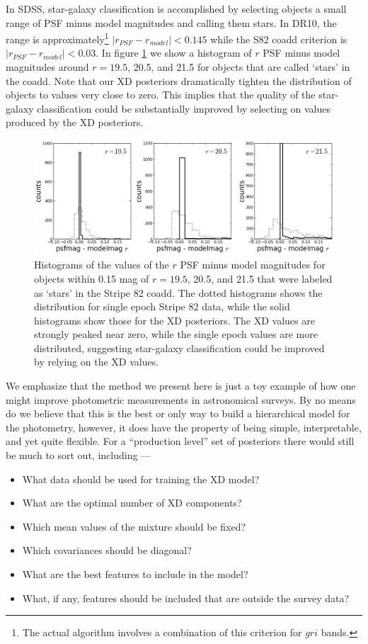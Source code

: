 \documentclass[12pt,preprint]{aastex}
\begin{document}
In SDSS, star-galaxy classification is accomplished by selecting objects a
small range of PSF minus model magnitudes and calling them stars.  In DR10,
the range is approximately\footnote{The actual algorithm involves a combination
of this criterion for $gri$ bands.} $|r_{PSF} - r_{model}| < 0.145$ while the
S82 coadd criterion is $|r_{PSF} - r_{model}| < 0.03$.  In figure \ref{fig:pmm}
we show a histogram of $r$ PSF minus model magnitudes around $r=19.5$,
20.5, and 21.5 for objects that are called `stars' in the coadd.  Note that
our XD posteriors dramatically tighten the distribution of objects to values
very close to zero.  This implies that the quality of the star-galaxy
classification could be substantially improved by selecting on values produced
by the XD posteriors.

\begin{figure}
\centering
\includegraphics[width=16cm]{fig6.png}
\caption{Histograms of the values of the $r$ PSF minus model magnitudes for 
objects within 0.15 mag of $r = 19.5$, 20.5, and 21.5 that were labeled as 
`stars' in the Stripe 82 coadd.  The dotted histograms shows the distribution
for single epoch Stripe 82 data, while the solid histograms show those for the
XD posteriors.  The XD values are strongly peaked near zero, while the single
epoch values are more distributed, suggesting star-galaxy classification
could be improved by relying on the XD values.  
}
\label{fig:pmm}
\end{figure}

We emphasize that the method we present here is just a toy example of how one 
might improve photometric measurements in astronomical surveys.  By no means do
we believe that this is the best or only way to build a hierarchical model for 
the photometry, however, it does have the property of being simple,
interpretable, and yet quite flexible.  For a ``production level'' set of
posteriors there would still be much to sort out, including ---

\begin{itemize}
\item What data should be used for training the XD model?
\item What are the optimal number of XD components?
\item Which mean values of the mixture should be fixed?
\item Which covariances should be diagonal?
\item What are the best features to include in the model?
\item What, if any, features should be included that are outside the survey
data?
\end{itemize}
\end{document}
